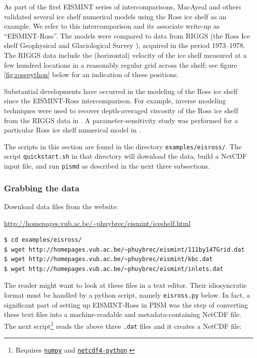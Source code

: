 \documentclass[11pt,final]{amsart}
\begin{document}
As part of the first EISMINT series of intercomparisons, MacAyeal and others \cite{MacAyealetal} validated several ice shelf numerical models using the Ross ice shelf as an example.  We refer to this intercomparison and its associate write-up \cite{MacAyealetal} as ``EISMINT-Ross''.  The models were compared to data from RIGGS (the Ross Ice shelf Geophysical and Glaciological Survey \cite{RIGGS2,RIGGS1}), acquired in the period 1973--1978.   The RIGGS data include the (horizontal) velocity of the ice shelf measured at a few hundred locations in a reasonably regular grid across the shelf; see figure \ref{fig:rosspython} below for an indication of these positions.

Substantial developments have occurred in the modeling of the Ross ice shelf since the EISMINT-Ross intercomparison.  For example, inverse modeling techniques were used to recover depth-averaged viscosity of the Ross ice shelf from the RIGGS data in \cite{RommelaereMacAyeal}. A parameter-sensitivity study was performed for a particular Ross ice shelf numerical model in \cite{HumbertGreveHutter}.

The scripts in this section are found in the directory \verb|examples/eisross/|.  The script \verb|quickstart.sh| in that directory will download the data, build a NetCDF input file, and run \verb|pismd| as described in the next three subsections.

\subsubsection*{Grabbing the data}  Download data files from the website:

\centerline{\url{http://homepages.vub.ac.be/~phuybrec/eismint/iceshelf.html}}
\small

\begin{verbatim}
$ cd examples/eisross/
$ wget http://homepages.vub.ac.be/~phuybrec/eismint/111by147Grid.dat
$ wget http://homepages.vub.ac.be/~phuybrec/eismint/kbc.dat
$ wget http://homepages.vub.ac.be/~phuybrec/eismint/inlets.dat
\end{verbatim}
\normalsize The reader might want to look at these files in a text editor.  Their idiosyncratic format must be handled by a python script, namely \verb|eisross.py| below.  In fact, a significant part of setting up EISMINT-Ross in PISM was the step of converting these text files into a machine-readable and metadata-containing NetCDF file.  The next script\footnote{Requires \href{http://numpy.scipy.org/}{\texttt{numpy}} and \href{http://code.google.com/p/netcdf4-python/}{\texttt{netcdf4-python}}.} reads the above three \verb|.dat| files and it creates a NetCDF file:
\end{document}
